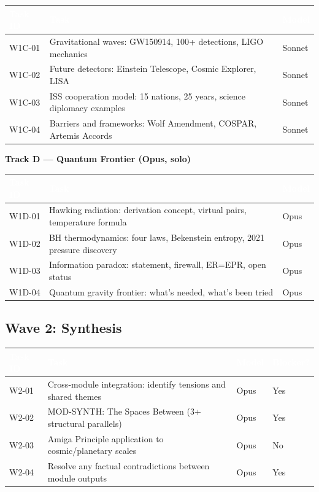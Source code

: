 \documentclass[11pt,letterpaper]{article}
\newcommand{\tableheader}[1]{\textbf{\sffamily\textcolor{white}{#1}}}
\begin{document}
\begin{center}
\begin{tabularx}{\textwidth}{L{2.5cm}XC{2cm}}
\toprule
{}
\tableheader{Task ID} & \tableheader{Task} & \tableheader{Model} \\
\midrule
W1C-01 & Gravitational waves: GW150914, 100+ detections, LIGO mechanics & Sonnet \\
W1C-02 & Future detectors: Einstein Telescope, Cosmic Explorer, LISA & Sonnet \\
W1C-03 & ISS cooperation model: 15 nations, 25 years, science diplomacy examples & Sonnet \\
W1C-04 & Barriers and frameworks: Wolf Amendment, COSPAR, Artemis Accords & Sonnet \\
\bottomrule
\end{tabularx}
\end{center}

\textbf{Track D --- Quantum Frontier (Opus, solo)}

\begin{center}
\begin{tabularx}{\textwidth}{L{2.5cm}XC{2cm}}
\toprule
{}
\tableheader{Task ID} & \tableheader{Task} & \tableheader{Model} \\
\midrule
W1D-01 & Hawking radiation: derivation concept, virtual pairs, temperature formula & Opus \\
W1D-02 & BH thermodynamics: four laws, Bekenstein entropy, 2021 pressure discovery & Opus \\
W1D-03 & Information paradox: statement, firewall, ER=EPR, open status & Opus \\
W1D-04 & Quantum gravity frontier: what's needed, what's been tried & Opus \\
\bottomrule
\end{tabularx}
\end{center}

\subsection{Wave 2: Synthesis}

\begin{center}
\begin{tabularx}{\textwidth}{L{2.5cm}XC{2cm}C{2cm}}
\toprule
{}
\tableheader{Task ID} & \tableheader{Task} & \tableheader{Model} & \tableheader{Blocker?} \\
\midrule
W2-01 & Cross-module integration: identify tensions and shared themes & Opus & Yes \\
W2-02 & MOD-SYNTH: The Spaces Between (3+ structural parallels) & Opus & Yes \\
W2-03 & Amiga Principle application to cosmic/planetary scales & Opus & No \\
W2-04 & Resolve any factual contradictions between module outputs & Opus & Yes \\
\bottomrule
\end{tabularx}
\end{center}
\end{document}
